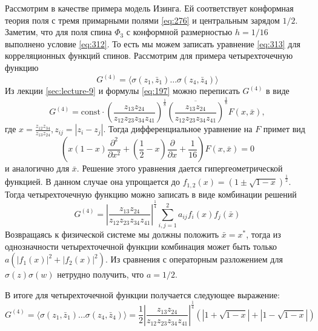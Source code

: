 \documentclass[a4paper,12pt]{article}
\theoremstyle{definition}
\theoremstyle{definition}
\theoremstyle{definition}
\begin{document}
Рассмотрим в качестве примера модель Изинга. Ей соответствует конформная теория поля с тремя примарными полями \eqref{eq:276} и центральным зарядом $1/2$. Заметим, что для поля спина $\Phi_{3}$ с конформной размерностью $h=1/16$ выполнено условие \eqref{eq:312}. То есть мы можем записать уравнение \eqref{eq:313} для корреляционных функций спинов. Рассмотрим для примера четырехточечную функцию
\begin{equation}
  \label{eq:314}
   G^{(4)} =\langle \sigma(z_1,\bar z_1)\dots \sigma(z_4,\bar z_4)\rangle
\end{equation}
Из лекции \ref{sec:lecture-9} и формулы \eqref{eq:197} можно переписать $G^{(4)}$ в виде
\begin{equation}
  \label{eq:315}
   G^{(4)} = \mathrm{const}\cdot \left(\frac{z_{13}z_{24}}{z_{12} z_{23}z_{34}z_{41}}\right)^{\frac{1}{8}} \overline{ \left(\frac{z_{13}z_{24}}{z_{12} z_{23}z_{34}z_{41}}\right)}^{\frac{1}{8}}F(x,\bar x),
\end{equation}
где $x=\frac{z_{12}z_{34}}{z_{13}z_{24}}, z_{ij}=\left| z_{i}-z_{j}\right|$. Тогда дифференциальное уравнение на $F$ примет вид
\begin{equation}
  \label{eq:316}
  \left( x(1-x) \frac{\partial^{2}}{\partial x^{2}} +(\frac{1}{2}-x)\frac{\partial}{\partial x}+\frac{1}{16}\right) F(x,\bar x)=0
\end{equation}
и аналогично для $\bar x$.
Решение этого уравнения дается гипергеометрической функцией. В данном случае она упрощается до $f_{1,2}(x)=(1\pm \sqrt{1-x})^{\frac{1}{2}}$. Тогда  четырехточечную функцию можно записать в виде комбинации решений
\begin{equation}
  \label{eq:317}
  G^{(4)} =  \left|\frac{z_{13}z_{24}}{z_{12} z_{23}z_{34}z_{41}}\right|^{\frac{1}{4}}\sum_{i,j=1}^{2}a_{ij}f_{i}(x)f_{j}(\bar x)
\end{equation}
Возвращаясь к физической системе мы должны положить $\bar x= x^{*}$, тогда из однозначности четырехточечной функции комбинация может быть только $a(|f_{1}(x)|^{2}+|f_{2}(x)|^{2})$. Из сравнения с операторным разложением для $\sigma(z)\sigma(w)$ нетрудно получить, что $a=1/2$.

В итоге для четырехточечной функции получается следующее выражение:
\begin{equation}
  \label{eq:302}
  G^{(4)} =\langle \sigma(z_1,\bar z_1)\dots \sigma(z_4,\bar z_4)\rangle = \frac{1}{2} \left|\frac{z_{13}z_{24}}{z_{12} z_{23}z_{34}z_{41}}\right|^{\frac{1}{4}}\left(\left|1+\sqrt{1-x}\right| + \left|1-\sqrt{1-x}\right|\right)
\end{equation}
\end{document}
